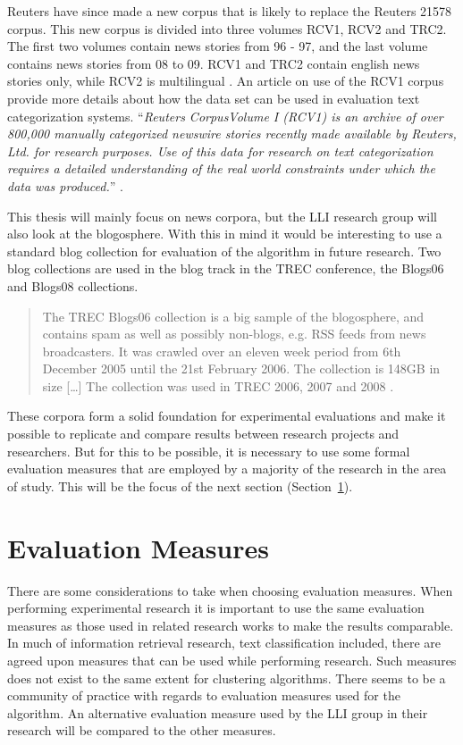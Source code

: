 Reuters have since made a new corpus that is likely to replace the Reuters 21578 corpus. This new corpus is divided into three volumes RCV1, RCV2 and TRC2. The first two volumes contain news stories from 96 - 97, and the last volume contains news stories from 08 to 09. RCV1 and TRC2 contain english news stories only, while RCV2 is multilingual \cite{NationalInstituteofStandardsandTechnology2004}. An article on use of the RCV1 corpus provide more details about how the data set can be used in evaluation text categorization systems. ``\textit{Reuters CorpusVolume I (RCV1) is an archive of over 800,000 manually categorized newswire stories recently made available by Reuters, Ltd. for research purposes. Use of this data for research on text categorization requires a detailed understanding of the real world constraints under which the data was produced.}'' \cite{Lewis2004}. 

This thesis will mainly focus on news corpora, but the LLI research group will also look at the blogosphere. With this in mind it would be interesting to use a standard blog collection for evaluation of the algorithm in future research. Two blog collections are used in the blog track in the TREC conference, the Blogs06 and Blogs08 collections.\begin{quote}
The TREC Blogs06 collection is a big sample of the blogosphere, and contains spam as well as possibly non-blogs, e.g. RSS feeds from news broadcasters. It was crawled over an eleven week period from 6th December 2005 until the 21st February 2006. The collection is 148GB in size [\dots] The collection was used in TREC 2006, 2007 and 2008 \cite{Macdonald2011}.
\end{quote} 

These corpora form a solid foundation for experimental evaluations and make it possible to replicate and compare results between research projects and researchers. But for this to be possible, it is necessary to use some formal evaluation measures that are employed by a majority of the research in the area of study. This will be the focus of the next section (Section~\ref{EvaluationMeasures}).

\section{Evaluation Measures}
\label{EvaluationMeasures}
There are some considerations to take when choosing evaluation measures. When performing experimental research it is important to use the same evaluation measures as those used in related research works to make the results comparable. In much of information retrieval research, text classification included, there are agreed upon measures that can be used while performing research. Such measures does not exist to the same extent for clustering algorithms. There seems to be a community of practice with regards to evaluation measures used for the \STC algorithm. An alternative evaluation measure used by the LLI group in their research will be compared to the other measures.


